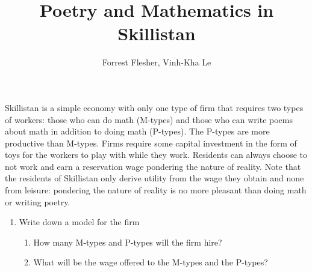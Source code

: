 \documentclass[12pt]{article}
\title{Poetry and Mathematics in Skillistan}
\author{Forrest Flesher, Vinh-Kha Le}
\begin{document}
\maketitle


\vspace*{0.15in}


Skillistan is a simple economy with only one type of firm that requires two types of workers:
those who can do math (M-types) and those who can write poems about math in addition
to doing math (P-types). The P-types are more productive than M-types. Firms
require some capital investment in the form of toys for the workers to play with while they
work. Residents can always choose to not work and earn a reservation wage pondering the
nature of reality. Note that the residents of Skillistan only derive utility from the wage
they obtain and none from leisure: pondering the nature of reality is no more pleasant
than doing math or writing poetry.

\begin{enumerate} 
\item Write down a model for the firm 
\begin{enumerate}
\item How many M-types and P-types will the firm hire?
\item What will be the wage offered to the M-types and the P-types?
\end{enumerate}
\end{enumerate}
\end{document}
